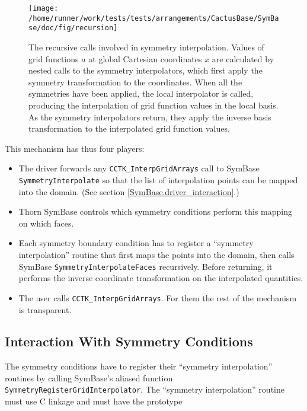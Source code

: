 \begin{figure}[tb]
\begin{center}
\texttt{[image: /home/runner/work/tests/tests/arrangements/CactusBase/SymBase/doc/fig/recursion]}
\end{center}
\caption[Symmetry interpolation] {
	  The recursive calls involved in symmetry interpolation.
	  Values of grid functions $a$ at global Cartesian coordinates $x$ are 
	  calculated by nested calls to the symmetry interpolators, which first
	  apply the symmetry transformation to the coordinates.  When all
	  the symmetries have been applied, the local interpolator is called,
	  producing the interpolation of grid function values in the local basis.
	  As the symmetry interpolators return, they apply the inverse basis
	  transformation to the interpolated grid function values.
}
\label{SymBase.recursion}
\end{figure}

This mechanism has thus four players:
\begin{itemize}
	\item The driver forwards any \texttt{CCTK\_InterpGridArrays} call
	  to SymBase \texttt{SymmetryInterpolate} so that the list of
	  interpolation points can be mapped into the domain. (See section
	  \ref{SymBase.driver_interaction}.)
	\item Thorn SymBase controls which symmetry conditions perform this
	  mapping on which faces.
	\item Each symmetry boundary condition has to register a ``symmetry
	  interpolation'' routine that first maps the points into the domain,
	  then calls SymBase \texttt{SymmetryInterpolateFaces} recursively.
	  Before returning, it performs the inverse coordinate transformation
	  on the interpolated quantities.
	\item The user calls \texttt{CCTK\_InterpGridArrays}.  For them
	  the rest of the mechanism is transparent.
\end{itemize}



\subsection{Interaction With Symmetry Conditions}

The symmetry conditions have to register their ``symmetry
interpolation'' routines by calling SymBase's aliased function
\texttt{SymmetryRegisterGridInterpolator}.  The ``symmetry
interpolation'' routine must use C linkage and must have the prototype

